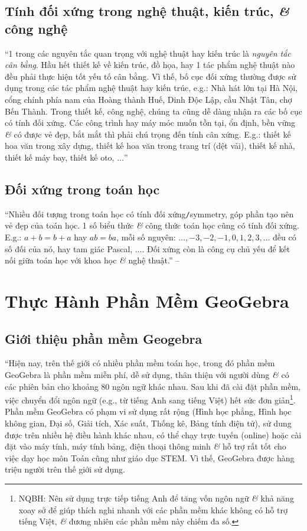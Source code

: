 \documentclass[oneside]{book}
\numberwithin{equation}{section}
\begin{document}
\subsection{Tính đối xứng trong nghệ thuật, kiến trúc, \textit{\&} công nghệ}
``1 trong các nguyên tắc quan trọng với nghệ thuật hay kiến trúc là \textit{nguyên tắc cân bằng}. Hầu hết thiết kế về kiến trúc, đồ họa, hay 1 tác phẩm nghệ thuật nào đều phải thực hiện tốt yếu tố cân bằng. Vì thế, bố cục đối xứng thường được sử dụng trong các tác phẩm nghệ thuật hay kiến trúc, e.g.: Nhà hát lớn tại Hà Nội, cổng chính phía nam của Hoàng thành Huế, Dinh Độc Lập, cầu Nhật Tân, chợ Bến Thành. Trong thiết kế, công nghệ, chúng ta cũng dễ dàng nhận ra các bố cục có tính đối xứng. Các công trình hay máy móc muốn tồn tại, ổn định, bền vững \textit{\&} có được vẻ đẹp, bắt mắt thì phải chú trọng đến tính cân xứng. E.g.: thiết kế hoa văn trong xây dựng, thiết kế hoa văn trong trang trí (dệt vải), thiết kế nhà, thiết kế máy bay, thiết kế oto, $\ldots$'' \cite[pp. 114--115]{Thai_Anh_Dat_Ha_Loan_Nam_Quang_Toan_6_tap_1}

\subsection{Đối xứng trong toán học}
``Nhiều đối tượng trong toán học có tính đối xứng\texttt{/}symmetry, góp phần tạo nên vẻ đẹp của toán học. 1 số biểu thức \textit{\&} công thức toán học cũng có tính đối xứng. E.g.: $a + b = b + a$ hay $ab = ba$, mỗi số nguyên: $\ldots,-3,-2,-1,0,1,2,3,\ldots$ đều có số đối của nó, hay tam giác Pascal, $\ldots$. Đối xứng còn là công cụ chủ yếu để kết nối giữa toán học với khoa học \textit{\&} nghệ thuật.'' -- \cite[p. 115]{Thai_Anh_Dat_Ha_Loan_Nam_Quang_Toan_6_tap_1}


\section{Thực Hành Phần Mềm GeoGebra}

\subsection{Giới thiệu phần mềm Geogebra}
``Hiện nay, trên thế giới có nhiều phần mềm toán học, trong đó phần mềm GeoGebra là phần mềm miễn phí, dễ sử dụng, thân thiện với người dùng \textit{\&} có các phiên bản cho khoảng 80 ngôn ngữ khác nhau. Sau khi đã cài đặt phần mềm, việc chuyển đổi ngôn ngữ (e.g., từ tiếng Anh sang tiếng Việt) hết sức đơn giản\footnote{NQBH: Nên sử dụng trực tiếp tiếng Anh để tăng vốn ngôn ngữ \textit{\&} khả năng xoay sở để giúp thích nghi nhanh với các phần mềm khác không có hỗ trợ tiếng Việt, \textit{\&} đương nhiên các phần mềm này chiếm đa số.}. Phần mềm GeoGebra có phạm vi sử dụng rất rộng (Hình học phẳng, Hình học không gian, Đại số, Giải tích, Xác suất, Thống kê, Bảng tính điện tử), sử dung được trên nhiều hệ điều hành khác nhau, có thể chạy trực tuyến (online) hoặc cài đặt vào máy tính, máy tính bảng, điện thoại thông minh \textit{\&} hỗ trợ rất tốt cho việc dạy học môn Toán cũng như giáo dục STEM. Vì thế, GeoGebra được hàng triệu người trên thế giới sử dụng.
\end{document}

